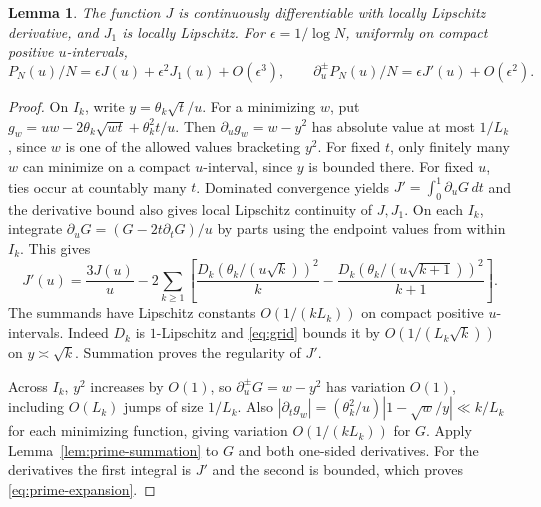 \documentclass[11pt]{amsart}
\newtheorem{lemma}[theorem]{Lemma}
\theoremstyle{remark}
\begin{document}
\begin{lemma}\label{lem:prime-expansion}
The function \(J\) is continuously differentiable with locally
Lipschitz derivative, and \(J_1\) is locally Lipschitz. For
\(\epsilon=1/\log N\), uniformly on compact positive \(u\)-intervals,
\begin{equation}\label{eq:prime-expansion}
 P_N(u)/N=\epsilon J(u)+\epsilon^2J_1(u)+O(\epsilon^3),\qquad
 \partial_u^\pm P_N(u)/N=\epsilon J'(u)+O(\epsilon^2).
\end{equation}
\end{lemma}
\begin{proof}
On \(I_k\), write \(y=\theta_k\sqrt t/u\). For a minimizing \(w\), put
\(g_w=uw-2\theta_k\sqrt{wt}+\theta_k^2t/u\).
Then \(\partial_u g_w=w-y^2\) has absolute value at most \(1/L_k\),
since \(w\) is one of the allowed values bracketing \(y^2\).
For fixed \(t\), only finitely many \(w\) can minimize on a compact
\(u\)-interval, since \(y\) is bounded there. For fixed \(u\), ties occur
at countably many \(t\). Dominated convergence yields \(J'=\int_0^1\partial_u G\,dt\) and the
derivative bound also gives local Lipschitz continuity of \(J,J_1\).
On each \(I_k\), integrate \(\partial_u G=(G-2t\partial_t G)/u\) by
parts using the endpoint values from within \(I_k\). This gives
\begin{equation}\label{eq:j-endpoints}
 J'(u)=\frac{3J(u)}{u}
 -2\sum_{k\ge1}\!\left[
 \frac{D_k(\theta_k/(u\sqrt k))^2}{k}
 -\frac{D_k(\theta_k/(u\sqrt{k+1}))^2}{k+1}\right].
\end{equation}
The summands have Lipschitz constants \(O(1/(kL_k))\) on compact positive
\(u\)-intervals. Indeed \(D_k\) is \(1\)-Lipschitz and \eqref{eq:grid}
bounds it by \(O(1/(L_k\sqrt k))\) on \(y\asymp\sqrt k\).
Summation proves the regularity of \(J'\).

Across \(I_k\), \(y^2\) increases by \(O(1)\), so
\(\partial_u^\pm G=w-y^2\) has variation \(O(1)\), including
\(O(L_k)\) jumps of size \(1/L_k\).
Also \(|\partial_t g_w|=(\theta_k^2/u)|1-\sqrt w/y|\ll k/L_k\)
for each minimizing function, giving variation \(O(1/(kL_k))\) for \(G\).
Apply Lemma~\ref{lem:prime-summation} to \(G\) and both one-sided
derivatives. For the derivatives the first integral is \(J'\)
and the second is bounded, which proves \eqref{eq:prime-expansion}.
\end{proof}
\end{document}
